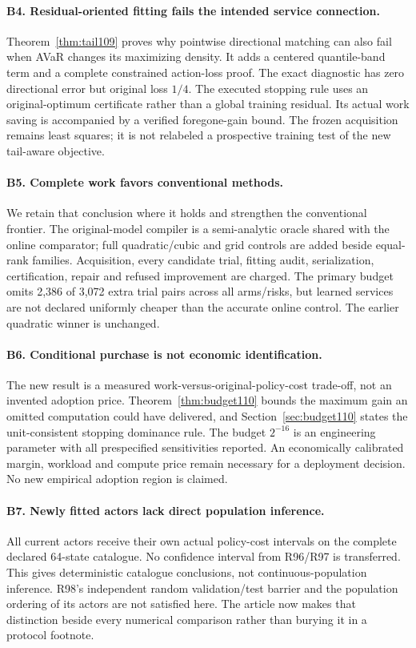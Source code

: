 \documentclass[11pt]{article}
\begin{document}
\paragraph{B4. Residual-oriented fitting fails the intended service connection.}
Theorem~\ref{thm:tail109} proves why pointwise directional matching can also fail when AVaR changes its maximizing density. It adds a centered quantile-band term and a complete constrained action-loss proof. The exact diagnostic has zero directional error but original loss $1/4$. The executed stopping rule uses an original-optimum certificate rather than a global training residual. Its actual work saving is accompanied by a verified foregone-gain bound. The frozen acquisition remains least squares; it is not relabeled a prospective training test of the new tail-aware objective.

\paragraph{B5. Complete work favors conventional methods.}
We retain that conclusion where it holds and strengthen the conventional frontier. The original-model compiler is a semi-analytic oracle shared with the online comparator; full quadratic/cubic and grid controls are added beside equal-rank families. Acquisition, every candidate trial, fitting audit, serialization, certification, repair and refused improvement are charged. The primary budget omits 2,386 of 3,072 extra trial pairs across all arms/risks, but learned services are not declared uniformly cheaper than the accurate online control. The earlier quadratic winner is unchanged.

\paragraph{B6. Conditional purchase is not economic identification.}
The new result is a measured work-versus-original-policy-cost trade-off, not an invented adoption price. Theorem~\ref{thm:budget110} bounds the maximum gain an omitted computation could have delivered, and Section~\ref{sec:budget110} states the unit-consistent stopping dominance rule. The budget $2^{-16}$ is an engineering parameter with all prespecified sensitivities reported. An economically calibrated margin, workload and compute price remain necessary for a deployment decision. No new empirical adoption region is claimed.

\paragraph{B7. Newly fitted actors lack direct population inference.}
All current actors receive their own actual policy-cost intervals on the complete declared 64-state catalogue. No confidence interval from R96/R97 is transferred. This gives deterministic catalogue conclusions, not continuous-population inference. R98's independent random validation/test barrier and the population ordering of its actors are not satisfied here. The article now makes that distinction beside every numerical comparison rather than burying it in a protocol footnote.
\end{document}
